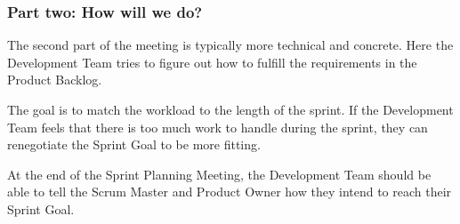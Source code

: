 \subsubsection{Part two: How will we do?}

The second part of the meeting is typically more technical and concrete. Here
the Development Team tries to figure out how to fulfill the requirements in the
Product Backlog\cite{scrumguide11}. 


The goal is to match the workload to the length of the sprint\cite{scrumguide11}.
 If the Development Team feels that there is too much work to 
 handle during the sprint, they can renegotiate the Sprint Goal to be more 
 fitting\cite{scrumguide11}.


At the end of the Sprint Planning Meeting, the Development Team should be able to tell the 
Scrum Master and Product Owner how they intend to reach their Sprint Goal.